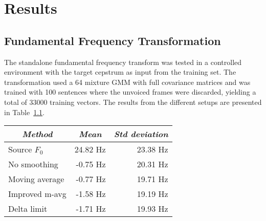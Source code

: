 \chapter{Results} %
\label{cha:results}

% 
% 
% 
% 
% 


\section{Fundamental Frequency Transformation} %
\label{sec:fundamental_frequency_ransformation}
The standalone fundamental frequency transform was tested in a controlled environment with the target cepstrum as input from the training set. The transformation used a 64 mixture GMM with full covariance matrices and was trained with 100 sentences where the unvoiced frames were discarded, yielding a total of 33000 training vectors. The results from the different setups are presented in Table~\ref{tab:pitch_pred_target_input}.
\begin{table}[htbp]
	\begin{center}
		\label{tab:pitch_pred_target_input}	
		\begin{tabular}{lrr}
			\toprule
			\multicolumn{1}{c}{\emph{Method}} & \multicolumn{1}{c}{\emph{Mean}} & \multicolumn{1}{c}{\emph{Std deviation}} \\
			\midrule
			Source $F_0$ & 24.82 Hz & 23.38 Hz \\
			No smoothing & -0.75 Hz & 20.31 Hz\\
			Moving average & -0.77 Hz & 19.71 Hz\\
			Improved m-avg & -1.58 Hz & 19.19 Hz \\
			Delta limit & -1.71 Hz & 19.93 Hz \\
			\bottomrule			
		\end{tabular}		
	\end{center}
\end{table}

